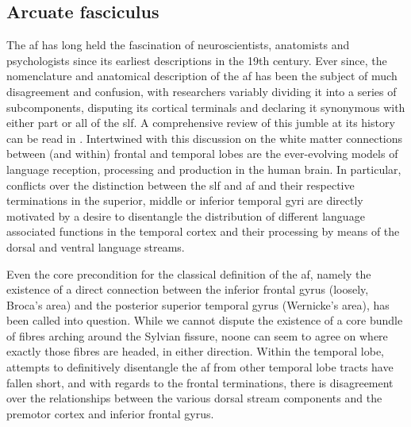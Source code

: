 \subsection{Arcuate fasciculus}

%

The \gls{af} has long held the fascination of neuroscientists, anatomists and psychologists since its earliest descriptions in the 19th century.\autocite{Burdach1822}
Ever since, the nomenclature and anatomical description of the \gls{af} has been the subject of much disagreement and confusion, with researchers variably dividing it into a series of subcomponents, disputing its cortical terminals and declaring it synonymous with either part or all of the \gls{slf}.
A comprehensive review of this jumble at its history can be read in \textcite{PortodeOliveira2021}.
Intertwined with this discussion on the white matter connections between (and within) frontal and temporal lobes are the ever-evolving models of language reception, processing and production in the human brain.\autocite{Becker2022a}
In particular, conflicts over the distinction between the \gls{slf} and \gls{af} and their respective terminations in the superior, middle or inferior temporal gyri are directly motivated by a desire to disentangle the distribution of different language associated functions in the temporal cortex and their processing by means of the dorsal and ventral language streams.\autocite{Hickok2004,Friederici2013a,Kljajevic2014a,Giampiccolo2022a,Becker2022a}

Even the core precondition for the classical definition of the \gls{af}, namely the existence of a direct connection between the inferior frontal gyrus (loosely, Broca's area) and the posterior superior temporal gyrus (Wernicke's area), has been called into question.\autocite{Dick2012,Giampiccolo2022a}
While we cannot dispute the existence of a core bundle of fibres arching around the Sylvian fissure, noone can seem to agree on where exactly those fibres are headed, in either direction.
Within the temporal lobe, attempts to definitively disentangle the \gls{af} from other temporal lobe tracts have fallen short,\autocite{Becker2022} and with regards to the frontal terminations, there is disagreement over the relationships between the various dorsal stream components and the premotor cortex and inferior frontal gyrus.\autocite{Kljajevic2014a,Giampiccolo2022a}

